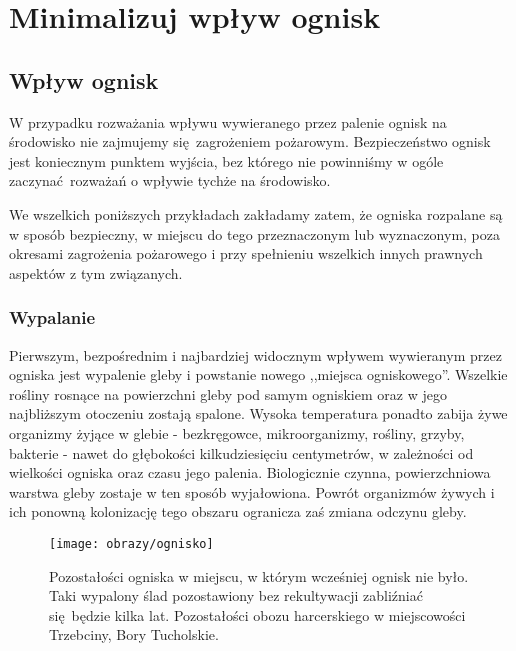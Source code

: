 
\chapter{Minimalizuj wpływ ognisk}
\label{rule4-fire}

\section{Wpływ ognisk}

W przypadku rozważania wpływu wywieranego przez palenie ognisk na środowisko nie zajmujemy się zagrożeniem pożarowym. Bezpieczeństwo ognisk jest koniecznym punktem wyjścia, bez którego nie powinniśmy w ogóle zaczynać rozważań o wpływie tychże na środowisko. 

We wszelkich poniższych przykładach zakładamy zatem, że ogniska rozpalane są w sposób bezpieczny, w miejscu do tego przeznaczonym lub wyznaczonym, poza okresami zagrożenia pożarowego i przy spełnieniu wszelkich innych prawnych aspektów z tym związanych.

\subsection{Wypalanie}

Pierwszym, bezpośrednim i najbardziej widocznym wpływem wywieranym przez ogniska jest wypalenie gleby i powstanie nowego ,,miejsca ogniskowego''. Wszelkie rośliny rosnące na powierzchni gleby pod samym ogniskiem oraz w jego najbliższym otoczeniu zostają spalone. Wysoka temperatura ponadto zabija żywe organizmy żyjące w glebie - bezkręgowce, mikroorganizmy, rośliny, grzyby, bakterie -  nawet do głębokości kilkudziesięciu centymetrów, w zależności od wielkości ogniska oraz czasu jego palenia.
Biologicznie czynna, powierzchniowa warstwa gleby zostaje w ten sposób wyjałowiona. Powrót organizmów żywych i ich ponowną kolonizację tego obszaru ogranicza zaś zmiana odczynu gleby.

\begin{figure}[!hb]
\end{figure}


\begin{wrapfigure}{r}{0.7\textwidth}
	\begin{center}
		\texttt{[image: obrazy/ognisko]}
	\end{center}
	\caption[Wypalone ognisko.]{Pozostałości ogniska w miejscu, w którym wcześniej ognisk nie było. Taki wypalony ślad pozostawiony bez rekultywacji zabliźniać się będzie kilka lat. Pozostałości obozu harcerskiego w miejscowości Trzebciny, Bory Tucholskie.}
\end{wrapfigure}

